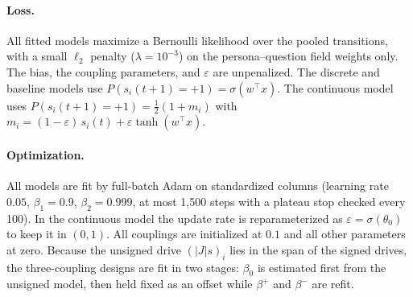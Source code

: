 \paragraph{Loss.} All fitted models maximize a Bernoulli likelihood over the
pooled transitions, with a small $\ell_2$ penalty ($\lambda = 10^{-3}$) on the
persona--question field weights only. The bias, the coupling parameters, and
$\varepsilon$ are unpenalized. The discrete and baseline models use
$P(s_i(t{+}1)=+1) = \sigma(w^{\top}x)$. The continuous model uses
$P(s_i(t{+}1)=+1) = \tfrac{1}{2}(1+m_i)$ with
$m_i = (1-\varepsilon)\, s_i(t) + \varepsilon \tanh(w^{\top}x)$.

\paragraph{Optimization.} All models are fit by full-batch Adam on standardized
columns (learning rate $0.05$, $\beta_1 = 0.9$, $\beta_2 = 0.999$, at most
1{,}500 steps with a plateau stop checked every 100). In the continuous model the update rate is reparameterized as $\varepsilon = \sigma(\theta_0)$ to keep it in $(0,1)$. All couplings are initialized at $0.1$ and all other parameters at zero. Because the unsigned drive $(|J|s)_i$ lies in the span of the signed drives, the
three-coupling designs are fit in two stages: $\beta_0$ is estimated first
from the unsigned model, then held fixed as an offset while $\beta^{+}$ and
$\beta^{-}$ are refit.
